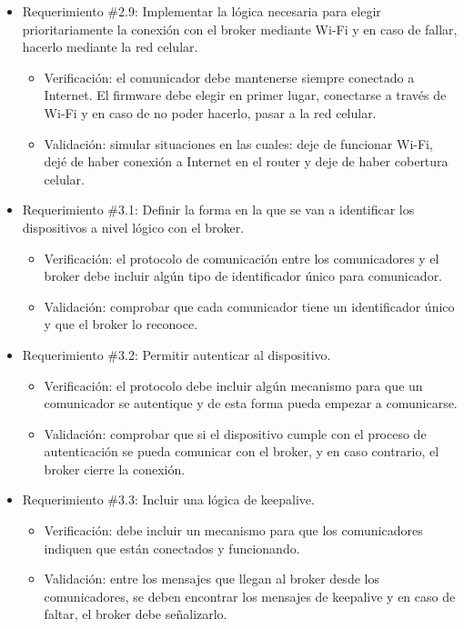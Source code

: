 \documentclass[
11pt, %
codirector, %
]{charter}
\begin{document}
\begin{itemize}
	\item Requerimiento \#2.9: Implementar la lógica necesaria para elegir prioritariamente la conexión con el broker mediante Wi-Fi y en caso de fallar, hacerlo mediante la red celular.
	\begin{itemize}
		\item Verificación: el comunicador debe mantenerse siempre conectado a Internet. El firmware debe elegir en primer lugar, conectarse a través de Wi-Fi y en caso de no poder hacerlo, pasar a la red celular.
		\item Validación: simular situaciones en las cuales: deje de funcionar Wi-Fi, dejé de haber conexión a Internet en el router y deje de haber cobertura celular.
	\end{itemize}
			
	\item Requerimiento \#3.1: Definir la forma en la que se van a identificar los dispositivos a nivel lógico con el broker.
	\begin{itemize}
		\item Verificación: el protocolo de comunicación entre los comunicadores y el broker debe incluir algún tipo de identificador único para comunicador.
		\item Validación: comprobar que cada comunicador tiene un identificador único y que el broker lo reconoce.
	\end{itemize}
			
	\item Requerimiento \#3.2: Permitir autenticar al dispositivo.
	\begin{itemize}
		\item Verificación: el protocolo debe incluir algún mecanismo para que un comunicador se autentique y de esta forma pueda empezar a comunicarse.
		\item Validación: comprobar que si el dispositivo cumple con el proceso de autenticación se pueda comunicar con el broker, y en caso contrario, el broker cierre la conexión.
	\end{itemize}
			
	\item Requerimiento \#3.3: Incluir una lógica de keepalive.
	\begin{itemize}
		\item Verificación: debe incluir un mecanismo para que los comunicadores indiquen que están conectados y funcionando.
		\item Validación: entre los mensajes que llegan al broker desde los comunicadores, se deben encontrar los mensajes de keepalive y en caso de faltar, el broker debe señalizarlo.
	\end{itemize}
			

\end{itemize}
\end{document}
